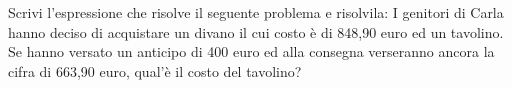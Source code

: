 \item Scrivi l'espressione che risolve il seguente problema e risolvila: I genitori di Carla hanno deciso di acquistare un divano il cui costo è di 848,90 euro ed un tavolino. Se hanno versato un anticipo di 400 euro ed alla consegna verseranno ancora la cifra di 663,90 euro, qual'è il costo del tavolino?
